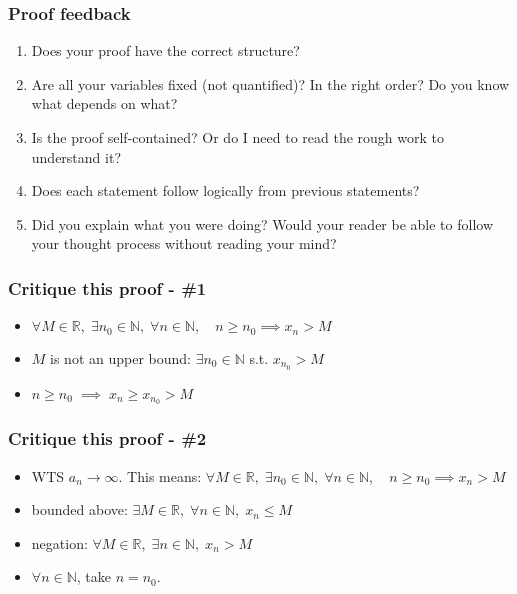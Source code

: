 \documentclass[14pt]{beamer}
\newcommand {\DS} [1] {${\displaystyle #1}$}
\newcommand {\R}{\mathbb{R}}
\newcommand {\N}{\mathbb{N}}
\newcommand{\setsize}[1]{\fontsize{#1}{#1}\selectfont} %
\newcommand{\smallerfont}{\setsize{13}} %
\begin{document}
\begin{frame}[t]
\frametitle{Proof feedback}

\begin{enumerate}
	\item Does your proof have the correct structure? 
	\item	Are all your variables fixed (not quantified)?  In the right order?  Do you know what depends on what?
	\item Is the proof self-contained?  Or do I need to read the rough work to understand it?
	\item Does each statement follow logically from previous statements?
	\item Did you explain what you were doing?  Would your reader be able to follow your thought process without reading your mind?
\end{enumerate}

\end{frame}
\begin{frame}[t]
\smallerfont
\frametitle{Critique this proof - \#1}

\begin{itemize}
\vfill
	\item  \DS{\forall M \in \R, \; \exists n_0 \in \N, \; \forall n \in \N, \quad n\geq n_0 \implies x_n > M}
\vfill \vfill
	\item $M$ is not an upper bound: \DS{\exists n_0 \in \N} s.t. \DS{x_{n_0} > M}
\vfill \vfill
	\item \DS{n \geq n_0 \; \implies \; x_n \geq x_{n_0} > M}
\vfill
\end{itemize}
\end{frame}
\begin{frame}[t]
\smallerfont
\frametitle{Critique this proof - \#2}

\begin{itemize}
\vfill
	\item  WTS $a_n \rightarrow \infty$.  This means:
\vspace{.2cm}
	 \quad \DS{\forall M \in \R, \; \exists n_0 \in \N, \; \forall n \in \N, \quad n\geq n_0 \implies x_n > M}
\vfill \vfill
	\item bounded above: \quad   \DS{\exists M \in \R, \; \forall n \in \N, \; x_n \leq M}
\vfill \vfill
	\item negation:   \quad \DS{\forall M \in \R, \; \exists n \in \N, \; x_n > M}
\vfill \vfill
	\item $\forall n \in \N$, take $n=n_0$.
\vfill
\end{itemize}
\end{frame}
\end{document}
